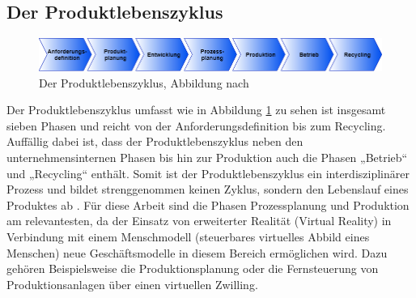 \subsection{Der Produktlebenszyklus}\label{sec:Produktlebenszyklus}
\begin{figure}[h]
	\centering
	\includegraphics[width=1\linewidth]{Bilder/A8_Produktlebenszyklus}
	\caption{Der Produktlebenszyklus, Abbildung nach \cite[S.3]{13}}
	\label{fig:Produktlebenszyklus}
\end{figure}
\noindent Der Produktlebenszyklus umfasst wie in Abbildung \ref{fig:Produktlebenszyklus} zu sehen ist insgesamt sieben Phasen und reicht von der Anforderungsdefinition bis zum Recycling. Auffällig dabei ist, dass der Produktlebenszyklus neben den unternehmensinternen Phasen bis hin zur Produktion auch die Phasen „Betrieb“ und „Recycling“ enthält. Somit ist der Produktlebenszyklus ein interdisziplinärer Prozess und bildet strenggenommen keinen Zyklus, sondern den Lebenslauf eines Produktes ab \cite[S.3]{13}.
\newline
Für diese Arbeit sind die Phasen Prozessplanung und Produktion am relevantesten, da der Einsatz von erweiterter Realität (Virtual Reality) in Verbindung mit einem Menschmodell (steuerbares virtuelles Abbild eines Menschen) neue Geschäftsmodelle in diesem Bereich ermöglichen wird. Dazu gehören Beispielsweise die Produktionsplanung oder die Fernsteuerung von Produktionsanlagen über einen virtuellen Zwilling.

